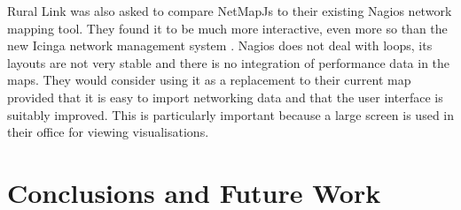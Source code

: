 \documentclass[11pt, a4paper]{article}
\begin{document}
Rural Link was also asked to compare NetMapJs to their existing Nagios network
mapping tool. They found it to be much more interactive, even more so than the
new Icinga network management system \cite{Icinga_website}. Nagios does not deal
with loops, its layouts are not very stable and there is no integration of
performance data in the maps. They would consider using it as a replacement to
their current map provided that it is easy to import networking data and that
the user interface is suitably improved. This is particularly important because
a large screen is used in their office for viewing visualisations. 

\newpage


\section{Conclusions and Future Work}
\label{sec:conclusion}

  
  
\end{document}
